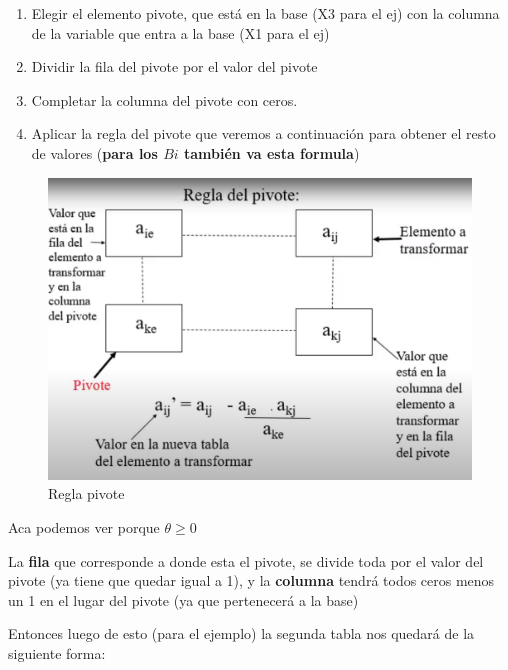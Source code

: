 \documentclass[titlepage,a4paper]{article}
\begin{document}
\begin{enumerate}
    \item Elegir el elemento pivote, que está en la base (X3 para el ej) con la columna de la variable que entra a la base (X1 para el ej)
    \item Dividir la fila del pivote por el valor del pivote
    \item Completar la columna del pivote con ceros.
    \item Aplicar la regla del pivote que veremos a continuación para obtener el resto de valores (\textbf{para los $Bi$ también va esta formula})
\end{enumerate}


\begin{figure}[H]
    \centering
    \includegraphics[scale=0.30]{regla_pivote.png}
    \caption{Regla pivote}
\end{figure}

Aca podemos ver porque $\theta \geq 0$

La \textbf{fila} que corresponde a donde esta el pivote, se divide toda por el valor del pivote (ya tiene que quedar igual a 1), y la \textbf{columna} tendrá todos ceros menos un 1 en el lugar del pivote (ya que pertenecerá a la base)

Entonces luego de esto (para el ejemplo) la segunda tabla nos quedará de la siguiente forma:
\end{document}
